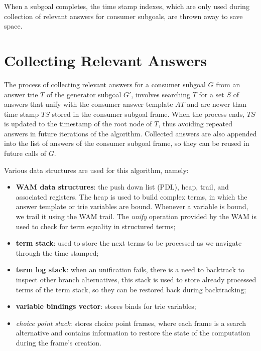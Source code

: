 When a subgoal completes, the time stamp indexes, which are only used
during collection of relevant answers
for consumer subgoals, are thrown away to save space.

\section{Collecting Relevant Answers}

The process of collecting relevant answers for a consumer subgoal $G$ from an answer trie $T$
of the generator subgoal $G'$, involves searching $T$ for a set $S$ of answers that unify
with the consumer answer template $AT$ and are newer than time stamp
$TS$ stored in the consumer subgoal frame.
When the process ends, $TS$ is updated to the
timestamp of the root node of $T$, thus avoiding repeated answers in future iterations
of the algorithm. Collected answers are also appended into the list of answers of the consumer subgoal frame, so they can be reused in future calls of $G$.

Various data structures are used for this algorithm, namely:

\begin{itemize}
  \item \textbf{WAM data structures}: the push down list (PDL),
  heap, trail, and associated registers. The heap is used to build complex terms, in which the
  answer template or trie variables are bound. Whenever a variable is bound, we trail it using the WAM trail. The \textit{unify} operation provided by the WAM is used to check for term equality in structured terms;
  
  \item \textbf{term stack}: used to store the next terms to be processed as we navigate through the time stamped;
  
  \item \textbf{term log stack}: when an unification fails, there is a need to backtrack to inspect other branch alternatives, this stack is used to store already processed terms of the term stack, so they can be restored back during backtracking;
  
  \item \textbf{variable bindings vector}: stores binds for trie variables;
  
  \item \textit{choice point stack}: stores choice point frames, where each frame is a search alternative and contains information to restore the state of the computation during the frame's creation.
  
\end{itemize}

